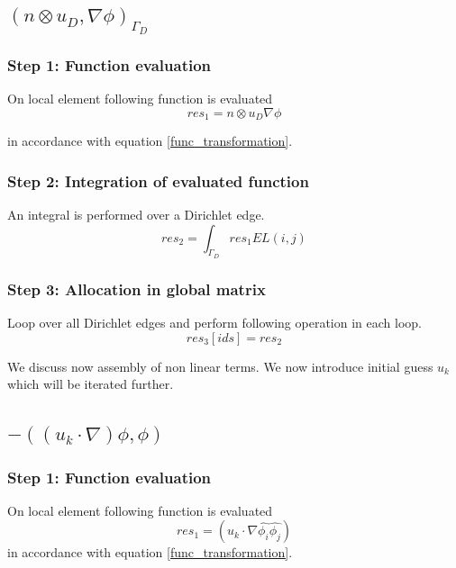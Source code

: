 \documentclass[a4paper,openany]{book}
\begin{document}
\subsection{$(n \otimes u_D,\nabla \phi)_{\Gamma_D} $}

\subsubsection{Step 1: Function evaluation}

On local element following function is evaluated
\begin{equation}
res_1 =  n \otimes u_D  \nabla \phi
\end{equation}

in accordance with equation \eqref{func_transformation}.\\

\subsubsection{Step 2: Integration of evaluated function}

An integral is performed over a Dirichlet edge.
\begin{equation}
res_2 = \int_{\Gamma_D} res_1 EL(i,j)
\end{equation}

\subsubsection{Step 3: Allocation in global matrix}

Loop over all Dirichlet edges and perform following operation in each loop. 
\begin{equation}
res_3[ids] = res_2
\end{equation}

We discuss now assembly of non linear terms. We now introduce initial guess $u_k$ which will be iterated further.\\

\subsection{$-((u_k \cdot \nabla)\phi , \phi)$}

\subsubsection{Step 1: Function evaluation}

On local element following function is evaluated 
\begin{equation}
res_1 = (u_k \cdot \nabla \hat{\phi_i} \hat{\phi_j})
\end{equation} 
in accordance with equation \eqref{func_transformation}.\\
\end{document}
